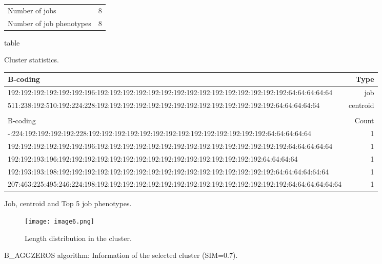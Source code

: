 \documentclass{jhps}
\begin{document}
\begin{figure}
	\begin{subtable}{\textwidth}
		\centering
		\begin{tabular}{ll}
			Number of jobs & 8 \\
			Number of job phenotypes & 8 \\
		\end{tabular}
		\caption{table}{Cluster statistics.}
		\label{cluster:use_case:bin_aggzeros:stats}
	\end{subtable}
	\medskip
	\begin{subtable}{\textwidth}
		\centering
		\begin{tiny}
			\begin{tabular}{l|r}
				\rowcolor{tblhead}
				B-coding                                                                                             &  Type     \\
				\hline
				192:192:192:192:192:192:196:192:192:192:192:192:192:192:192:192:192:192:192:192:192:192:64:64:64:64:64    &  job      \\
				511:238:192:510:192:224:228:192:192:192:192:192:192:192:192:192:192:192:192:192:192:64:64:64:64:64        &  centroid \\
				\multicolumn{2}{l}{}                                                                                      \\
				\rowcolor{tblhead}
				B-coding                                                                                             &  Count    \\
				\hline
				-:224:192:192:192:192:228:192:192:192:192:192:192:192:192:192:192:192:192:192:192:64:64:64:64:64          &  1        \\
				192:192:192:192:192:192:196:192:192:192:192:192:192:192:192:192:192:192:192:192:192:192:64:64:64:64:64    &  1        \\
				192:192:193:196:192:192:192:192:192:192:192:192:192:192:192:192:192:192:192:192:64:64:64:64               &  1        \\
				192:193:193:198:192:192:192:192:192:192:192:192:192:192:192:192:192:192:192:192:192:64:64:64:64:64:64     &  1        \\
				207:463:225:495:246:224:198:192:192:192:192:192:192:192:192:192:192:192:192:192:192:192:64:64:64:64:64:64 &  1        \\
			\end{tabular}
		\end{tiny}
		\caption{Job, centroid and Top 5 job phenotypes.}
		\label{cluster:use_case:bin_aggzeros:top_jobs}
	\end{subtable}
	\medskip
	\begin{subfigure}{\textwidth}
		\centering
		\texttt{[image: image6.png]}
		\caption{Length distribution in the cluster.}
		\label{cluster:use_case:bin_aggzeros:length}
	\end{subfigure}
	\caption{B\_AGGZEROS algorithm: Information of the selected cluster (SIM=0.7).}
	\label{cluster:use_case:bin_aggzeros}
\end{figure}
\end{document}
